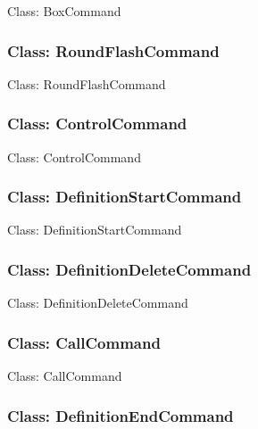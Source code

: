 \documentclass[11pt,twoside,openany,x11names,svgnames]{memoir}
\begin{document}
Class: BoxCommand

\subsubsection{Class: RoundFlashCommand}\label{Class-RoundFlashCommand}

Class: RoundFlashCommand

\subsubsection{Class: ControlCommand}\label{Class-ControlCommand}

Class: ControlCommand

\subsubsection{Class: DefinitionStartCommand}\label{Class-DefinitionStartCommand}

Class: DefinitionStartCommand

\subsubsection{Class: DefinitionDeleteCommand}\label{Class-DefinitionDeleteCommand}

Class: DefinitionDeleteCommand

\subsubsection{Class: CallCommand}\label{Class-CallCommand}

Class: CallCommand

\subsubsection{Class: DefinitionEndCommand}\label{Class-DefinitionEndCommand}
\end{document}
